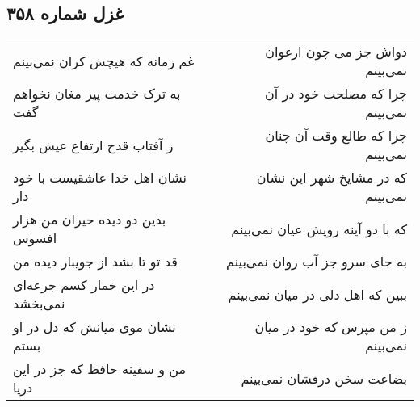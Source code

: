 \begin{center}
\section*{غزل شماره ۳۵۸}
\label{sec:sh358}
\begin{longtable}{l p{0.5cm} r}
غم زمانه که هیچش کران نمی‌بینم
&&
دواش جز می چون ارغوان نمی‌بینم
\\
به ترک خدمت پیر مغان نخواهم گفت
&&
چرا که مصلحت خود در آن نمی‌بینم
\\
ز آفتاب قدح ارتفاع عیش بگیر
&&
چرا که طالع وقت آن چنان نمی‌بینم
\\
نشان اهل خدا عاشقیست با خود دار
&&
که در مشایخ شهر این نشان نمی‌بینم
\\
بدین دو دیده حیران من هزار افسوس
&&
که با دو آینه رویش عیان نمی‌بینم
\\
قد تو تا بشد از جویبار دیده من
&&
به جای سرو جز آب روان نمی‌بینم
\\
در این خمار کسم جرعه‌ای نمی‌بخشد
&&
ببین که اهل دلی در میان نمی‌بینم
\\
نشان موی میانش که دل در او بستم
&&
ز من مپرس که خود در میان نمی‌بینم
\\
من و سفینه حافظ که جز در این دریا
&&
بضاعت سخن درفشان نمی‌بینم
\\
\end{longtable}
\end{center}
